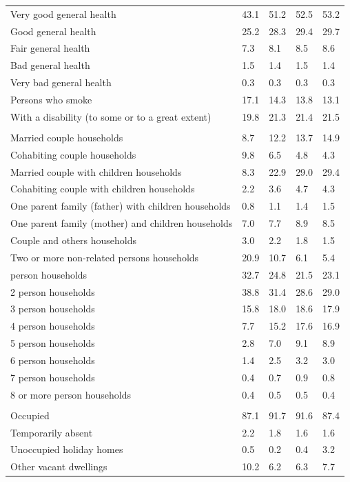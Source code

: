 \documentclass{article}
\begin{document}
\begin{table}[h]
\begin{tabular}{KTTTT}
    \hline
Very good general health & 43.1& 51.2&52.5& 53.2\\
Good general health & 25.2& 28.3& 29.4& 29.7\\
Fair general health & 7.3& 8.1&8.5& 8.6\\
Bad general health & 1.5& 1.4&1.5& 1.4\\
Very bad general health & 0.3& 0.3&0.3& 0.3\\
    \hline
Persons who smoke & 17.1& 14.3&13.8& 13.1\\
    \hline
With a disability (to some or to a great extent) & 19.8& 21.3&21.4& 21.5\\
\hline
    \\ 
    \hline
Married couple households &  8.7& 12.2& 13.7& 14.9\\
Cohabiting couple households & 9.8& 6.5& 4.8& 4.3\\
Married couple with children households &  8.3& 22.9& 29.0& 29.4\\
Cohabiting couple with children households & 2.2& 3.6& 4.7& 4.3\\
One parent family (father) with  children households & 0.8& 1.1& 1.4& 1.5\\
One parent family (mother) and children households & 7.0& 7.7& 8.9& 8.5\\
Couple and others households  & 3.0& 2.2& 1.8& 1.5\\
Two or more non-related persons households & 20.9& 10.7&  6.1&  5.4\\
     person households & 32.7& 24.8& 21.5& 23.1\\
2 person households & 38.8& 31.4& 28.6& 29.0\\
3 person households & 15.8& 18.0& 18.6& 17.9\\
4 person households &  7.7& 15.2& 17.6& 16.9\\
5 person households & 2.8& 7.0& 9.1& 8.9\\
6 person households & 1.4& 2.5& 3.2& 3.0\\
7 person households & 0.4& 0.7& 0.9& 0.8\\
8 or more person households & 0.4& 0.5& 0.5& 0.4\\
\hline
    \\ 
    \hline
Occupied & 87.1& 91.7& 91.6& 87.4\\
Temporarily absent & 2.2& 1.8& 1.6& 1.6\\
Unoccupied holiday homes & 0.5& 0.2& 0.4& 3.2\\
Other vacant dwellings & 10.2&  6.2&  6.3&  7.7\\
\hline
\end{tabular}
\end{table}
\end{document}
